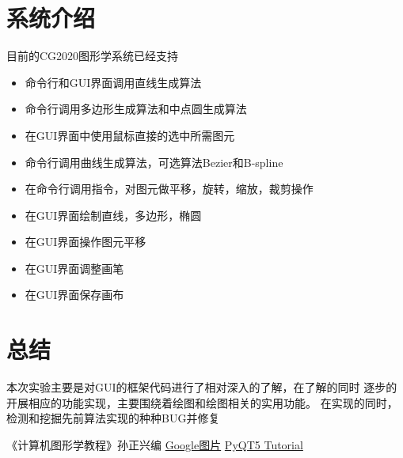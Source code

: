 \documentclass[a4paper,UTF8]{article}
\theoremstyle{definition}
\begin{document}
\section{系统介绍}
目前的CG2020图形学系统已经支持
\begin{itemize}
    \item 命令行和GUI界面调用直线生成算法
    \item 命令行调用多边形生成算法和中点圆生成算法
    \item 在GUI界面中使用鼠标直接的选中所需图元
    \item 命令行调用曲线生成算法，可选算法Bezier和B-spline
    \item 在命令行调用指令，对图元做平移，旋转，缩放，裁剪操作
    \item 在GUI界面绘制直线，多边形，椭圆
    \item 在GUI界面操作图元平移
    \item 在GUI界面调整画笔
    \item 在GUI界面保存画布
\end{itemize}

\section{总结}
本次实验主要是对GUI的框架代码进行了相对深入的了解，在了解的同时
逐步的开展相应的功能实现，主要围绕着绘图和绘图相关的实用功能。
在实现的同时，检测和挖掘先前算法实现的种种BUG并修复




\begin{thebibliography}{99}  
    《计算机图形学教程》孙正兴编 
     \href{https://www.google.com/imghp?hl=zh-CN&ogbl}{Google图片}
     \href{https://build-system.fman.io/pyqt5-tutorial}{PyQT5 Tutorial}
    
\end{thebibliography}
\end{document}
